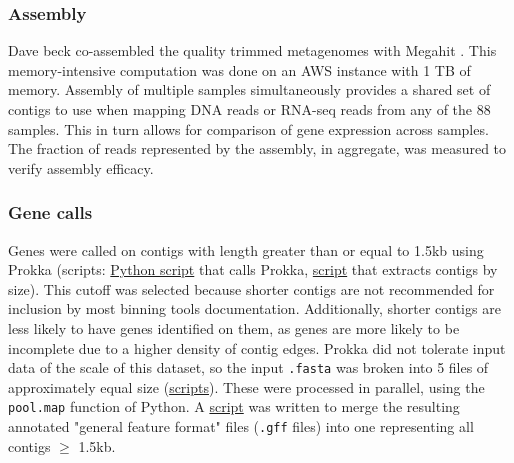 \subsubsection{Assembly} %
Dave beck co-assembled the quality trimmed metagenomes with Megahit \cite{li2015}.
This memory-intensive computation was done on an AWS instance with 1 TB of memory.
Assembly of multiple samples simultaneously provides a shared set of contigs to use when mapping DNA reads or RNA-seq reads from any of the 88 samples.  %
This in turn allows for comparison of gene expression across samples.
The fraction of reads represented by the assembly, in aggregate, was measured to verify assembly efficacy.

\subsubsection{Gene calls}   %
Genes were called on contigs with length greater than or equal to 1.5kb using Prokka \cite{seemann2014} (scripts: \href{https://github.com/BeckResearchLab/meta4/blob/master/m4b_binning/assembly/prokka/prokka.py}{Python script} that calls Prokka, \href{https://github.com/BeckResearchLab/meta4/blob/master/m4b_binning/assembly/contigs_by_length/select_contigs_by_size.py}{script} that extracts contigs by size).
This cutoff was selected because shorter contigs are not recommended for inclusion by most binning tools documentation.
Additionally, shorter contigs are less likely to have genes identified on them, as genes are more likely to be incomplete due to a higher density of contig edges.
Prokka did not tolerate input data of the scale of this dataset, so the input \texttt{.fasta} was broken into 5 files of approximately equal size (\href{https://github.com/BeckResearchLab/meta4/tree/master/m4b_binning/assembly/prokka/contigs}{scripts}).
These were processed in parallel, using the \texttt{pool.map} function of Python.
A \href{https://github.com/BeckResearchLab/meta4/blob/master/m4b_binning/assembly/prokka/contigs/glue_together_gffs.py}{script} was written to merge the resulting annotated "general feature format" files (\texttt{.gff} files) into one representing all contigs $\geq$ 1.5kb.

